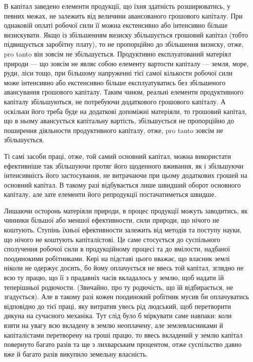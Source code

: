 В капітал заведено елементи продукції, що їхня здатність розширюватись,
у певних межах, не залежить від величини авансованого грошового
капіталу. При однаковій оплаті робочої сили її можна екстенсивно
або інтенсивно більше визискувати. Якщо із збільшенням визиску збільшується
грошовий капітал (тобто підвищується заробітну плату), то не
пропорційно до збільшення визиску, отже, pro tanto він зовсім не збільшується.
Продуктивно експлуатований матеріял природи — що зовсім не являє
собою елементу вартости капіталу — земля, море, руди, ліси тощо, при
більшому напруженні тієї самої кількостн робочої сили може інтенсивно
або екстенсивно більше експлуатуватись без збільшеного авансування грошового
капіталу. Таким чином, реальні елементи продуктивного капіталу
збільшуються, не потребуючи додаткового грошового капіталу. А оскільки
його треба буде на додаткові допоміжні матеріяли, то грошовий капітал,
що в ньому авансується капітальну вартість, збільшується не пропорційно
до поширення діяльности продуктивного капіталу, отже, pro
tanto зовсім не збільшується.

Ті самі засоби праці, отже, той самий основний капітал, можна використати
ефективніше так збільшуючи протяг його щоденного вживання,
як і збільшуючи інтенсивнісгь його застосування, не витрачаючи
при цьому додаткових грошей на основний капітал. В такому разі відбувається
лише швидший оборот основного капіталу, але зате елементи
його репродукції постачатиметься швидше.

Лишаючи осторонь матеріяли природи, в процес продукції можуть
заводитись, як чинники більшої або меншої ефективности, сили
природи, що нічого не коштують. Ступінь їхньої ефективности
залежить від методів та поступу науки, що нічого не коштують капіталістові.
Це саме стосується до суспільного сполучення робочої сили в продукційному
процесі та до вмілости, надбаної поодинокими робітниками.
Кері на підставі цього вважає, що власник землі ніколи не одержує досить,
бо йому оплачується не ввесь той капітал, зглядно не всю ту
працю, що її з прадавніх часів вкладалось у землю, щоб надати їй теперішньої
родючости. (Звичайно, про ту родючість, що їй відбирається,
не згадується). Але в такому разі кожен поодинокий робітник мусив
би оплачуватись відповідно до тієї праці, яку витратив увесь рід людський,
щоб перетворити дикуна на сучасного механіка. Тут слід було б
міркувати саме навпаки: коли взяти на увагу всю вкладену в землю
неоплачену, але землевласниками й капіталістами перетворену на гроші
працю, то ввесь вкладений у землю капітал повернуто багато разів та
ще з лихварським процентом, отже суспільство давно вже й багато
разів викупило земельну власність.

